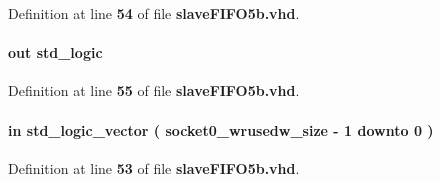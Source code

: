 Definition at line {\bf 54} of file {\bf slave\+F\+I\+F\+O5b.\+vhd}.

\paragraph[{socket0\+\_\+fifo\+\_\+wr}]{ {\bfseries \textcolor{keywordflow}{out}\textcolor{vhdlchar}{ }} {\bfseries \textcolor{comment}{std\+\_\+logic}\textcolor{vhdlchar}{ }} \hspace{0.3cm}{\ttfamily [Port]}}\label{classslaveFIFO5b_a38f6fe122be4308823ec5c6048f9ce8b}


Definition at line {\bf 55} of file {\bf slave\+F\+I\+F\+O5b.\+vhd}.

\paragraph[{socket0\+\_\+fifo\+\_\+wrusedw}]{ {\bfseries \textcolor{keywordflow}{in}\textcolor{vhdlchar}{ }} {\bfseries \textcolor{comment}{std\+\_\+logic\+\_\+vector}\textcolor{vhdlchar}{ }\textcolor{vhdlchar}{(}\textcolor{vhdlchar}{ }\textcolor{vhdlchar}{ }\textcolor{vhdlchar}{ }\textcolor{vhdlchar}{ }{\bfseries {\bf socket0\+\_\+wrusedw\+\_\+size}} \textcolor{vhdlchar}{-\/}\textcolor{vhdlchar}{ } \textcolor{vhdldigit}{1} \textcolor{vhdlchar}{ }\textcolor{keywordflow}{downto}\textcolor{vhdlchar}{ }\textcolor{vhdlchar}{ } \textcolor{vhdldigit}{0} \textcolor{vhdlchar}{ }\textcolor{vhdlchar}{)}\textcolor{vhdlchar}{ }} \hspace{0.3cm}{\ttfamily [Port]}}\label{classslaveFIFO5b_adb27390b4bb3611252699ba164853bb3}


Definition at line {\bf 53} of file {\bf slave\+F\+I\+F\+O5b.\+vhd}.

